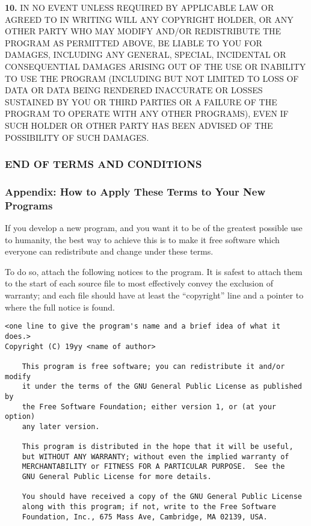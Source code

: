 \documentclass[]{article}
\begin{document}
\textbf{10.} IN NO EVENT UNLESS REQUIRED BY APPLICABLE LAW OR AGREED TO
IN WRITING WILL ANY COPYRIGHT HOLDER, OR ANY OTHER PARTY WHO MAY MODIFY
AND/OR REDISTRIBUTE THE PROGRAM AS PERMITTED ABOVE, BE LIABLE TO YOU FOR
DAMAGES, INCLUDING ANY GENERAL, SPECIAL, INCIDENTAL OR CONSEQUENTIAL
DAMAGES ARISING OUT OF THE USE OR INABILITY TO USE THE PROGRAM
(INCLUDING BUT NOT LIMITED TO LOSS OF DATA OR DATA BEING RENDERED
INACCURATE OR LOSSES SUSTAINED BY YOU OR THIRD PARTIES OR A FAILURE OF
THE PROGRAM TO OPERATE WITH ANY OTHER PROGRAMS), EVEN IF SUCH HOLDER OR
OTHER PARTY HAS BEEN ADVISED OF THE POSSIBILITY OF SUCH DAMAGES.

\subsubsection{END OF TERMS AND CONDITIONS}

\subsubsection{Appendix: How to Apply These Terms to Your New Programs}

If you develop a new program, and you want it to be of the greatest
possible use to humanity, the best way to achieve this is to make it
free software which everyone can redistribute and change under these
terms.

To do so, attach the following notices to the program. It is safest to
attach them to the start of each source file to most effectively convey
the exclusion of warranty; and each file should have at least the
``copyright'' line and a pointer to where the full notice is found.

\begin{verbatim}
<one line to give the program's name and a brief idea of what it does.>
Copyright (C) 19yy <name of author>

    This program is free software; you can redistribute it and/or modify
    it under the terms of the GNU General Public License as published by
    the Free Software Foundation; either version 1, or (at your option)
    any later version.

    This program is distributed in the hope that it will be useful,
    but WITHOUT ANY WARRANTY; without even the implied warranty of
    MERCHANTABILITY or FITNESS FOR A PARTICULAR PURPOSE.  See the
    GNU General Public License for more details.

    You should have received a copy of the GNU General Public License
    along with this program; if not, write to the Free Software
    Foundation, Inc., 675 Mass Ave, Cambridge, MA 02139, USA.
\end{verbatim}
\end{document}

